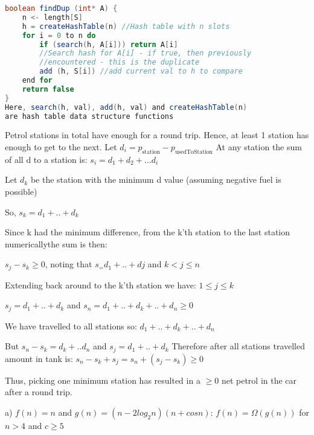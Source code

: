 \documentclass[11pt, a4paper]{article}
\begin{document}
\begin{lstlisting}[frame=single, language=java]
boolean findDup (int* A) {
    n <- length[S]
    h = createHashTable(n) //Hash table with n slots
    for i = 0 to n do
        if (search(h, A[i])) return A[i] 
        //Search hash for A[i] - if true, then previously
        //encountered - this is the duplicate
        add (h, S[i]) //add current val to h to compare
    end for
    return false
}
Here, search(h, val), add(h, val) and createHashTable(n) 
are hash table data structure functions
\end{lstlisting}


Petrol stations in total have enough for a round trip. 
Hence, at least 1 station has enough to get to the next.
Let $d_i = p_\text{station} - p_\text{usedToStation}$
At any station the sum of all d to a station is:
$s_i = d_1 + d_2 + \dots d_i$

Let $d_k$ be the station with the minimum d value (assuming negative fuel is possible)

So, $s_k = d_1 + .. + d_k$

Since k had the minimum difference, from the k'th station to the last station numericallythe sum is then:

$s_j - s_k \ge 0 $, noting that $s_ = d_1 + .. + dj$ and  $k < j \le n$ 

Extending back around to the k'th station we have: $1 \le j \le k$

$s_j = d_1 + .. + d_k$ and $s_n = d_1 +.. + d_k + .. + d_n \ge 0 $

We have travelled to all stations so:
$d_1 +.. + d_k + .. + d_n$

But $s_n - s_k = d_k + .. d_n$ and $s_j = d_1 + .. + d_k$
Therefore after all stations travelled amount in tank is:
$s_n - s_k + s_j = s_n + (s_j - s_k) \ge 0$

Thus, picking one minimum station has resulted in a $\ge 0$ net petrol in the car after a round trip.



a) $f(n) = n $ and $g(n) = (n − 2 log_2 n)(n + cos n)$: $f(n) = \Omega(g(n))$ for $n > 4$ and $c \ge 5$
\end{document}
